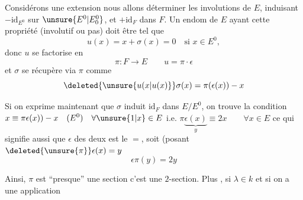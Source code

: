 Considérons une extension
nous allons déterminer les involutions
de $E$, induisant $-\mathrm{id}_{E^0}$ sur $\unsure{E^0|E_0^0}$, et
$+\mathrm{id}_F$ dans $F$. Un endom \inserted{$\sigma$} de $E$ ayant
cette propriété (involutif ou pas) doit
être tel que
\[
u(x)=x+\sigma(x)=0\quad\text{si }x\in E^0,
\]
donc $u$ se factorise en
\[
\pi:F\longrightarrow E\qquad u=\pi\cdot\epsilon
\]
et  $\sigma$ se récupère via $\pi$ comme
\[
\deleted{\unsure{u(x|u(x)}} \sigma(x)=\pi(\epsilon(x))-x
\]

Si on exprime maintenant que
$\sigma$ induit $\mathrm{id}_F$ dans $E/E^0$, on trouve
la condition \(\displaystyle x\equiv\pi\epsilon(x))-x\quad(E^0)\quad\forall \unsure{1|x}\in E\)
i.e. \(\displaystyle \pi\underbrace{\epsilon(x)}_{y}\equiv2x\qquad\forall x\in E\)
ce qui signifie aussi que  $\epsilon$ des deux
 est le $=$, soit (posant $\deleted{\unsure{\pi}}\epsilon(x)=y$
\[
\boxed{\epsilon\pi(y)=2y}
\]

Ainsi, $\pi$ est ``presque'' une section
c'est une $2$-section.  Plus ,
si $\lambda\in k$ et si on a une application
